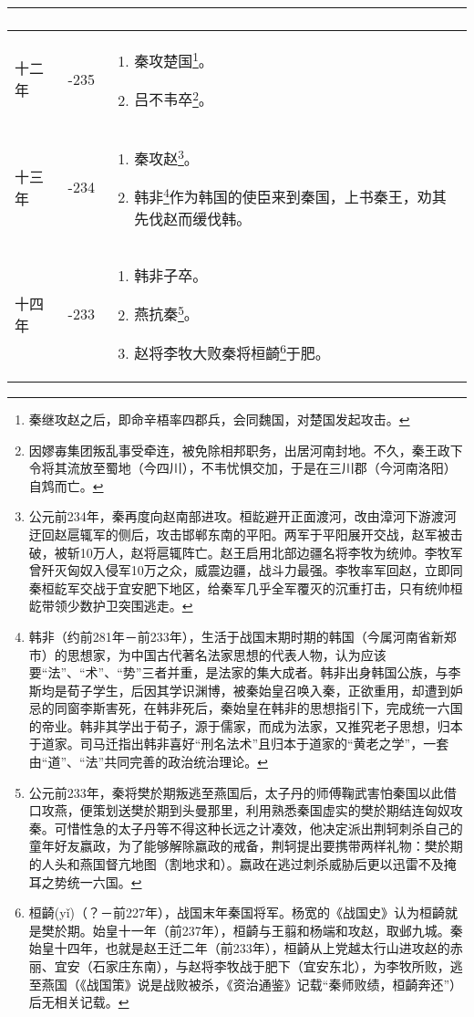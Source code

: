 \begin{longtable}{|>{\centering\scriptsize}m{2em}|>{\centering\scriptsize}m{1.3em}|>{\centering}m{8.8em}|}
\begin{enumerate}
  \end{enumerate} \tabularnewline\hline
  十二年 & -235 & \begin{enumerate}
    \tiny
  \item 秦攻楚国\footnote{秦继攻赵之后，即命辛梧率四郡兵，会同魏国，对楚国发起攻击。}。
  \item 吕不韦卒\footnote{因嫪毐集团叛乱事受牵连，被免除相邦职务，出居河南封地。不久，秦王政下令将其流放至蜀地（今四川），不韦忧惧交加，于是在三川郡（今河南洛阳）自鸩而亡。}。
  \end{enumerate} \tabularnewline\hline
  十三年 & -234 & \begin{enumerate}
    \tiny
  \item 秦攻赵\footnote{公元前234年，秦再度向赵南部进攻。桓龁避开正面渡河，改由漳河下游渡河迂回赵扈辄军的侧后，攻击邯郸东南的平阳。两军于平阳展开交战，赵军被击破，被斩10万人，赵将扈辄阵亡。赵王启用北部边疆名将李牧为统帅。李牧军曾歼灭匈奴入侵军10万之众，威震边疆，战斗力最强。李牧率军回赵，立即同秦桓龁军交战于宜安肥下地区，给秦军几乎全军覆灭的沉重打击，只有统帅桓龁带领少数护卫突围逃走。}。
  \item 韩非\footnote{韩非（约前281年－前233年），生活于战国末期时期的韩国（今属河南省新郑市）的思想家，为中国古代著名法家思想的代表人物，认为应该要“法”、“术”、“势”三者并重，是法家的集大成者。韩非出身韩国公族，与李斯均是荀子学生，后因其学识渊博，被秦始皇召唤入秦，正欲重用，却遭到妒忌的同窗李斯害死，在韩非死后，秦始皇在韩非的思想指引下，完成统一六国的帝业。韩非其学出于荀子，源于儒家，而成为法家，又推究老子思想，归本于道家。司马迁指出韩非喜好“刑名法术”且归本于道家的“黄老之学”，一套由“道”、“法”共同完善的政治统治理论。}作为韩国的使臣来到秦国，上书秦王，劝其先伐赵而缓伐韩。
  \end{enumerate} \tabularnewline\hline
  十四年 & -233 & \begin{enumerate}
    \tiny
  \item 韩非子卒。
  \item 燕抗秦\footnote{公元前233年，秦将樊於期叛逃至燕国后，太子丹的师傅鞠武害怕秦国以此借口攻燕，便策划送樊於期到头曼那里，利用熟悉秦国虚实的樊於期结连匈奴攻秦。可惜性急的太子丹等不得这种长远之计凑效，他决定派出荆轲刺杀自己的童年好友嬴政，为了能够解除嬴政的戒备，荆轲提出要携带两样礼物：樊於期的人头和燕国督亢地图（割地求和）。嬴政在逃过刺杀威胁后更以迅雷不及掩耳之势统一六国。}。
  \item 赵将李牧大败秦将桓齮\footnote{桓齮(yǐ)（？－前227年），战国末年秦国将军。杨宽的《战国史》认为桓齮就是樊於期。始皇十一年（前237年），桓齮与王翦和杨端和攻赵，取邺九城。秦始皇十四年，也就是赵王迁二年（前233年），桓齮从上党越太行山进攻赵的赤丽、宜安（石家庄东南），与赵将李牧战于肥下（宜安东北），为李牧所败，逃至燕国（《战国策》说是战败被杀，《资治通鉴》记载“秦师败绩，桓齮奔还”）后无相关记载。}于肥。

\end{enumerate}
\end{longtable}

